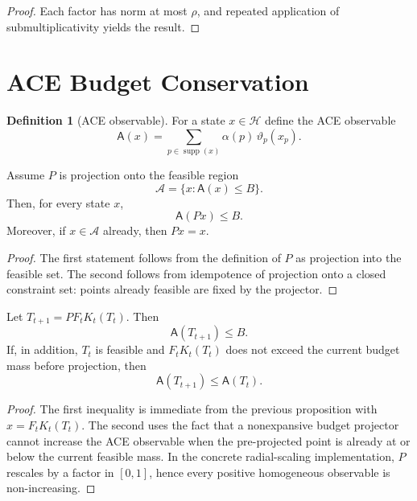 \documentclass[12pt,a4paper]{article}
\theoremstyle{definition}
\newtheorem{definition}{Definition}[section]
\theoremstyle{plain}
\theoremstyle{remark}
\begin{document}
\begin{proof}
Each factor has norm at most $\rho$, and repeated application of
submultiplicativity yields the result.
\end{proof}

\section{ACE Budget Conservation}

\begin{definition}[ACE observable]
For a state $x\in\mathcal{H}$ define the ACE observable
\begin{equation}
\mathsf{A}(x) = \sum_{p\in\operatorname{supp}(x)} \alpha(p)\,\vartheta_p(x_p).
\end{equation}
\end{definition}

\begin{proposition}
Assume $P$ is projection onto the feasible region
\begin{equation}
\mathcal{A} = \{x : \mathsf{A}(x) \le B\}.
\end{equation}
Then, for every state $x$,
\begin{equation}
\mathsf{A}(P x) \le B.
\end{equation}
Moreover, if $x\in\mathcal{A}$ already, then $P x = x$.
\end{proposition}

\begin{proof}
The first statement follows from the definition of $P$ as projection into the
feasible set. The second follows from idempotence of projection onto a closed
constraint set: points already feasible are fixed by the projector.
\end{proof}

\begin{proposition}
Let $T_{t+1}=P F_t K_t(T_t)$. Then
\begin{equation}
\mathsf{A}(T_{t+1}) \le B.
\end{equation}
If, in addition, $T_t$ is feasible and $F_tK_t(T_t)$ does not exceed the current
budget mass before projection, then
\begin{equation}
\mathsf{A}(T_{t+1}) \le \mathsf{A}(T_t).
\end{equation}
\end{proposition}

\begin{proof}
The first inequality is immediate from the previous proposition with
$x = F_tK_t(T_t)$. The second uses the fact that a nonexpansive budget projector
cannot increase the ACE observable when the pre-projected point is already at or
below the current feasible mass. In the concrete radial-scaling implementation,
$P$ rescales by a factor in $[0,1]$, hence every positive homogeneous observable
is non-increasing.
\end{proof}
\end{document}
